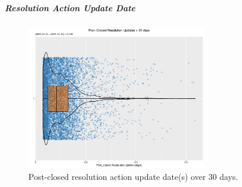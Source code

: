 \documentclass[linenumber]{jdsart}
\begin{document}
		
		
    
    

		

		

\subparagraph{Resolution Action Update Date}
	
\begin{figure}[tbp]
  \centering
  \includegraphics[width = 0.7\textwidth]{post_closed_violin_chart.pdf}
  \caption{Post-closed resolution action update date(s) over 30 days.}
  \label{fig:resolution-violin}
\end{figure}
\end{document}
